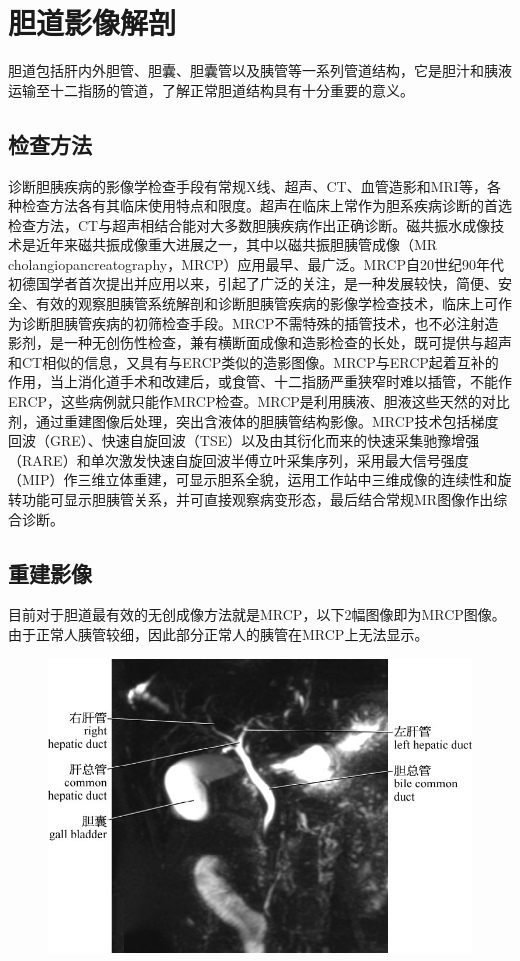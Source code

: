\chapter{胆道影像解剖}

胆道包括肝内外胆管、胆囊、胆囊管以及胰管等一系列管道结构，它是胆汁和胰液运输至十二指肠的管道，了解正常胆道结构具有十分重要的意义。

\section{检查方法}

诊断胆胰疾病的影像学检查手段有常规X线、超声、CT、血管造影和MRI等，各种检查方法各有其临床使用特点和限度。超声在临床上常作为胆系疾病诊断的首选检查方法，CT与超声相结合能对大多数胆胰疾病作出正确诊断。磁共振水成像技术是近年来磁共振成像重大进展之一，其中以磁共振胆胰管成像（MR
cholangiopancreatography，MRCP）应用最早、最广泛。MRCP自20世纪90年代初德国学者首次提出并应用以来，引起了广泛的关注，是一种发展较快，简便、安全、有效的观察胆胰管系统解剖和诊断胆胰管疾病的影像学检查技术，临床上可作为诊断胆胰管疾病的初筛检查手段。MRCP不需特殊的插管技术，也不必注射造影剂，是一种无创伤性检查，兼有横断面成像和造影检查的长处，既可提供与超声和CT相似的信息，又具有与ERCP类似的造影图像。MRCP与ERCP起着互补的作用，当上消化道手术和改建后，或食管、十二指肠严重狭窄时难以插管，不能作ERCP，这些病例就只能作MRCP检查。MRCP是利用胰液、胆液这些天然的对比剂，通过重建图像后处理，突出含液体的胆胰管结构影像。MRCP技术包括梯度回波（GRE）、快速自旋回波（TSE）以及由其衍化而来的快速采集驰豫增强（RARE）和单次激发快速自旋回波半傅立叶采集序列，采用最大信号强度（MIP）作三维立体重建，可显示胆系全貌，运用工作站中三维成像的连续性和旋转功能可显示胆胰管关系，并可直接观察病变形态，最后结合常规MR图像作出综合诊断。

\section{重建影像}

目前对于胆道最有效的无创成像方法就是MRCP，以下2幅图像即为MRCP图像。由于正常人胰管较细，因此部分正常人的胰管在MRCP上无法显示。
\begin{figure}[!htbp]
 \centering
 \includegraphics{./images/Image00164.jpg}
  \end{figure} 
 \FloatBarrier

